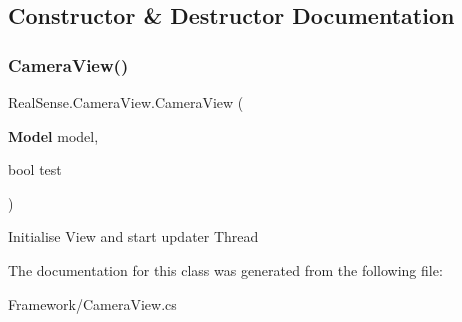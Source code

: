 \subsection{Constructor \& Destructor Documentation}
\mbox{\label{class_real_sense_1_1_camera_view_ac30953a5ea5feba14c2243833e2e5908}} 
\subsubsection{Camera\+View()}
{\footnotesize\ttfamily Real\+Sense.\+Camera\+View.\+Camera\+View (\begin{DoxyParamCaption}\item[{\textbf{ Model}}]{model,  }\item[{bool}]{test }\end{DoxyParamCaption})}

Initialise View and start updater Thread 

The documentation for this class was generated from the following file\+:\begin{DoxyCompactItemize}
\item 
Framework/Camera\+View.\+cs\end{DoxyCompactItemize}
